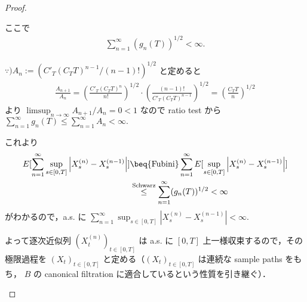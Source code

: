 \documentclass{jsarticle}
\begin{document}
\begin{proof}
\begin{enumerate}[label=(\roman*)]



        ここで
        \begin{align}
            \sum_{n=1}^{\infty}(g_n(T))^{1/2}<\infty.
        \end{align}

        \begin{screen}
            $\because) A_n:=(C'_T(C_T T)^{n-1}/(n-1)!)^{1/2}$ と定めると
            \begin{align}
                \frac{A_{n+1}}{A_n}
                = \left(\frac{C'_T(C_T T)^{n}}{n!}\right)^{1/2}\cdot \left(\frac{(n-1)!}{C'_T(C_T T)^{n-1}}\right)^{1/2}
                = \left(\frac{C_T T}{n}\right)^{1/2}
            \end{align}
            より $\limsup_{n\to\infty}A_{n+1}/A_n=0<1$ なので ratio test から $\sum_{n=1}^{\infty}g_n(T)\le\sum_{n=1}^{\infty}A_n<\infty.$
        \end{screen}

        これより
        \begin{align}
            E[\sum_{n=1}^{\infty}\sup_{s\in[0, T]}\left\lvert X_s^{(n)}-X_s^{(n-1)}\right\rvert]
            &\beq{\text{Fubini}} \sum_{n=1}^{\infty}E[\sup_{s\in[0, T]}\left\lvert X_s^{(n)}-X_s^{(n-1)}\right\rvert] \\
            &\stackrel{\text{Schwarz}}{\le} \sum_{n=1}^{\infty}(g_n(T))^{1/2} < \infty
        \end{align}
        がわかるので，a.s. に $\sum_{n=1}^{\infty}\sup_{s\in[0, T]}\left\lvert X_s^{(n)}-X_s^{(n-1)}\right\rvert<\infty.$
        
        よって逐次近似列 $(X_t^{(n)})_{t\in[0, T]}$ は a.s. に $[0, T]$ 上一様収束するので，その極限過程を $(X_t)_{t\in[0, T]}$ と定める（$(X_t)_{t\in[0, T]}$ は連続な sample paths をもち， $B$ の canonical filtration に適合しているという性質を引き継ぐ）．
    \end{enumerate}
\end{proof}
\end{document}
